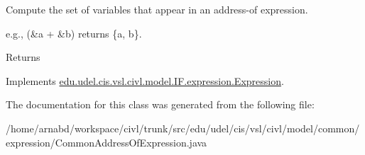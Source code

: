 Compute the set of variables that appear in an address-\/of expression. 

e.\+g., {\ttfamily (\&a + \&b)} returns {\ttfamily \{a, b\}}.

\begin{DoxyReturn}{Returns}

\end{DoxyReturn}


Implements \hyperlink{interfaceedu_1_1udel_1_1cis_1_1vsl_1_1civl_1_1model_1_1IF_1_1expression_1_1Expression_ac2ad0236534bec54b91ee78ff658cbe0}{edu.\+udel.\+cis.\+vsl.\+civl.\+model.\+I\+F.\+expression.\+Expression}.



The documentation for this class was generated from the following file\+:\begin{DoxyCompactItemize}
\item 
/home/arnabd/workspace/civl/trunk/src/edu/udel/cis/vsl/civl/model/common/expression/Common\+Address\+Of\+Expression.\+java\end{DoxyCompactItemize}
